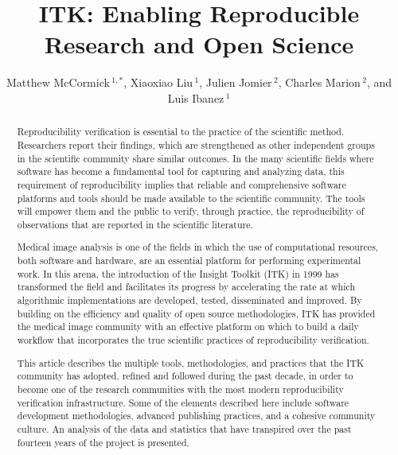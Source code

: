 \documentclass{frontiersENG} %
\def\firstAuthorLast{McCormick {et~al.}} %
\def\Authors{Matthew McCormick\,$^{1,*}$,
  Xiaoxiao Liu\,$^{1}$,
  Julien Jomier\,$^{2}$,
  Charles Marion\,$^{2}$,
  and Luis Ibanez\,$^1$}
\begin{document}
\onecolumn
{}

\title[ITK Reproducible Research]{ITK: Enabling Reproducible Research and Open Science}
\author[\firstAuthorLast ]{\Authors}
\address{}
\correspondance{}
\extraAuth{}%

\maketitle
\begin{abstract}

Reproducibility verification is essential to the practice of the scientific
method. Researchers report their findings, which are strengthened as other
independent groups in the scientific community share similar outcomes.  In the
many scientific fields where software has become a fundamental tool for
capturing and analyzing data, this requirement of reproducibility implies that
reliable and comprehensive software platforms and tools should be made
available to the scientific community. The tools will empower them and the public to
verify, through practice, the reproducibility of observations that are reported in
the scientific literature.

Medical image analysis is one of the fields in which the use of computational
resources, both software and hardware, are an essential platform for performing
experimental work. In this arena, the introduction of the Insight Toolkit (ITK)
in 1999 has transformed the field and facilitates its progress by accelerating
the rate at which algorithmic implementations are developed, tested,
disseminated and improved. By building on the efficiency and quality of open
source methodologies, ITK has provided the medical image community with an
effective platform on which to build a daily workflow that incorporates the
true scientific practices of reproducibility verification.

This article describes the multiple tools, methodologies, and practices that the
ITK community has adopted, refined and followed during the past decade, in
order to become one of the research communities with the most modern reproducibility
verification infrastructure. Some of the elements described here include
software development methodologies, advanced publishing practices, and a
cohesive community culture. An analysis of the data and statistics that have
transpired over the past fourteen years of the project is presented.

\end{abstract}
\end{document}
